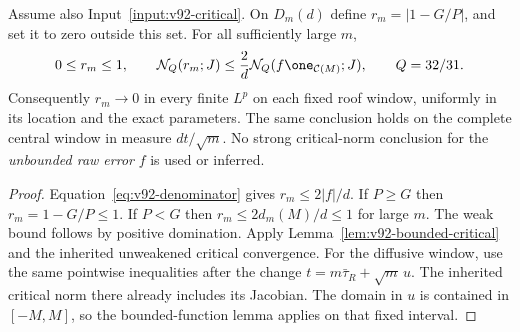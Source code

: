 \begin{theorem}
\label{thm:v92-reciprocal}
Assume also Input~\ref{input:v92-critical}. On $D_m(d)$ define
$r_m=|1-G/P|$, and set it to zero outside this set. For all sufficiently
large $m$,
\begin{equation}\label{eq:v92-reciprocal-bound}
 0\le r_m\le1,\qquad
 \mathcal N_Q(r_m;J)\le\frac2d
                    \mathcal N_Q(f\one_{\mathcal C(M)};J),
 \qquad Q=32/31.
\end{equation}
Consequently $r_m\to0$ in every finite $L^p$ on each fixed roof
window, uniformly in its location and the exact parameters. The same
conclusion holds on the complete central window in measure $dt/\sqrt m$.
No strong critical-norm conclusion for the \emph{unbounded raw error}
$f$ is used or inferred.
\end{theorem}
\begin{proof}
Equation~\eqref{eq:v92-denominator} gives $r_m\le2|f|/d$.
If $P\ge G$ then $r_m=1-G/P\le1$. If $P<G$ then
$r_m\le2d_m(M)/d\le1$ for large $m$. The weak bound follows by
positive domination. Apply Lemma~\ref{lem:v92-bounded-critical}
and the inherited unweakened critical convergence. For the diffusive
window, use the same pointwise inequalities after the change
$t=m\bar\tau_R+\sqrt m\,u$. The inherited critical norm there
already includes its Jacobian. The domain in $u$ is contained in
$[-M,M]$, so the bounded-function lemma applies on that fixed interval.
\end{proof}
